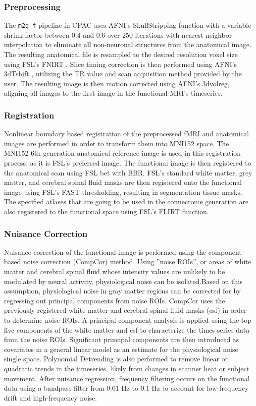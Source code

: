 \subsubsection{Preprocessing}
The \texttt{m2g-f} pipeline in CPAC uses AFNI's SkullStripping function \cite{AFNI} with a variable shrink factor between 0.4 and 0.6 over 250 iterations with nearest neighbor interpolation to eliminate all non-neuronal structures from the anatomical image. The resulting anatomical file is resampled to the desired resolution voxel size using FSL's FNIRT \cite{fsl1, fsl2, fsl3}. Slice timing correction is then performed using AFNI's 3dTshift \cite{AFNI}, utilizing the TR value and scan acquisition method provided by the user. The resulting image is then motion corrected using AFNI's 3dvolreg, aligning all images to the first image in the functional MRI's timeseries.

\subsubsection{Registration}
Nonlinear boundary based registration of the preprocessed fMRI and anatomical images are performed in order to transform them into MNI152 space. The MNI152 6th generation anatomical reference image \cite{mni152} is used in this registration process, as it is FSL's preferred image. The functional image is then registered to the anatomical scan using FSL bet \cite{fsl1, fsl2, fsl3} with BBR. FSL's standard white matter, grey matter, and cerebral spinal fluid masks are then registered onto the functional image using FSL's FAST thresholding, resulting in segmentation tissue masks. The specified atlases that are going to be used in the connectome generation are also registered to the functional space using FSL's FLIRT function.

\subsubsection{Nuisance Correction}
Nuisance correction of the functional image is performed using the component based noise correction (CompCor) method. Using ''noise ROIs'', or areas of white matter and cerebral spinal fluid whose intensity values are unlikely to be modulated by neural activity, physiological noise can be isolated\cite{compcor}.Based on this assumption, physiological noise in gray matter regions can be corrected for by regressing out principal components from noise ROIs. CompCor uses the previously registered white matter and cerebral spinal fluid masks (csf) in order to determine noise ROIs. A principal component analysis is applied using the top five components of the white matter and csf to characterize the times series data from the noise ROIs. Significant principal components are then introduced as covariates in a general linear model as an estimate for the physiological noise single space. Polynomial Detrending is also performed to remove linear or quadratic trends in the timeseries, likely from changes in scanner heat or subject movement. After nuisance regression, frequency filtering occurs on the functional data using a bandpass filter from 0.01 Hz to 0.1 Hz to account for low-frequency drift and high-frequency noise.

